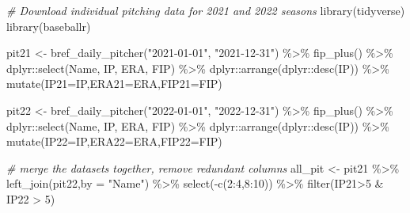 \documentclass[
  11pt,
]{book}
\newenvironment{Shaded}{\begin{snugshade}}{\end{snugshade}}
\newcommand{\AttributeTok}[1]{\textcolor[rgb]{0.77,0.63,0.00}{#1}}
\newcommand{\CommentTok}[1]{\textcolor[rgb]{0.56,0.35,0.01}{\textit{#1}}}
\newcommand{\DecValTok}[1]{\textcolor[rgb]{0.00,0.00,0.81}{#1}}
\newcommand{\FunctionTok}[1]{\textcolor[rgb]{0.00,0.00,0.00}{#1}}
\newcommand{\NormalTok}[1]{#1}
\newcommand{\OtherTok}[1]{\textcolor[rgb]{0.56,0.35,0.01}{#1}}
\newcommand{\SpecialCharTok}[1]{\textcolor[rgb]{0.00,0.00,0.00}{#1}}
\newcommand{\StringTok}[1]{\textcolor[rgb]{0.31,0.60,0.02}{#1}}
\theoremstyle{definition}
\theoremstyle{definition}
\theoremstyle{definition}
\theoremstyle{definition}
\theoremstyle{remark}
\begin{document}
\begin{Shaded}
\begin{Highlighting}[]
\CommentTok{\# Download individual pitching data for 2021 and 2022 seasons}
\FunctionTok{library}\NormalTok{(tidyverse)}
\FunctionTok{library}\NormalTok{(baseballr)}

\NormalTok{pit21 }\OtherTok{\textless{}{-}} \FunctionTok{bref\_daily\_pitcher}\NormalTok{(}\StringTok{"2021{-}01{-}01"}\NormalTok{, }\StringTok{"2021{-}12{-}31"}\NormalTok{) }\SpecialCharTok{\%\textgreater{}\%} 
  \FunctionTok{fip\_plus}\NormalTok{() }\SpecialCharTok{\%\textgreater{}\%} 
\NormalTok{  dplyr}\SpecialCharTok{::}\FunctionTok{select}\NormalTok{(Name, IP, ERA, FIP) }\SpecialCharTok{\%\textgreater{}\%}
\NormalTok{  dplyr}\SpecialCharTok{::}\FunctionTok{arrange}\NormalTok{(dplyr}\SpecialCharTok{::}\FunctionTok{desc}\NormalTok{(IP)) }\SpecialCharTok{\%\textgreater{}\%}
  \FunctionTok{mutate}\NormalTok{(}\AttributeTok{IP21=}\NormalTok{IP,}\AttributeTok{ERA21=}\NormalTok{ERA,}\AttributeTok{FIP21=}\NormalTok{FIP)}

\NormalTok{pit22 }\OtherTok{\textless{}{-}} \FunctionTok{bref\_daily\_pitcher}\NormalTok{(}\StringTok{"2022{-}01{-}01"}\NormalTok{, }\StringTok{"2022{-}12{-}31"}\NormalTok{) }\SpecialCharTok{\%\textgreater{}\%} 
  \FunctionTok{fip\_plus}\NormalTok{() }\SpecialCharTok{\%\textgreater{}\%} 
\NormalTok{  dplyr}\SpecialCharTok{::}\FunctionTok{select}\NormalTok{(Name, IP, ERA, FIP) }\SpecialCharTok{\%\textgreater{}\%}
\NormalTok{  dplyr}\SpecialCharTok{::}\FunctionTok{arrange}\NormalTok{(dplyr}\SpecialCharTok{::}\FunctionTok{desc}\NormalTok{(IP)) }\SpecialCharTok{\%\textgreater{}\%}
  \FunctionTok{mutate}\NormalTok{(}\AttributeTok{IP22=}\NormalTok{IP,}\AttributeTok{ERA22=}\NormalTok{ERA,}\AttributeTok{FIP22=}\NormalTok{FIP)}

\CommentTok{\# merge the datasets together, remove redundant columns}
\NormalTok{all\_pit }\OtherTok{\textless{}{-}}\NormalTok{ pit21 }\SpecialCharTok{\%\textgreater{}\%} 
  \FunctionTok{left\_join}\NormalTok{(pit22,}\AttributeTok{by =} \StringTok{"Name"}\NormalTok{) }\SpecialCharTok{\%\textgreater{}\%} 
  \FunctionTok{select}\NormalTok{(}\SpecialCharTok{{-}}\FunctionTok{c}\NormalTok{(}\DecValTok{2}\SpecialCharTok{:}\DecValTok{4}\NormalTok{,}\DecValTok{8}\SpecialCharTok{:}\DecValTok{10}\NormalTok{)) }\SpecialCharTok{\%\textgreater{}\%}
  \FunctionTok{filter}\NormalTok{(IP21}\SpecialCharTok{\textgreater{}}\DecValTok{5} \SpecialCharTok{\&}\NormalTok{ IP22 }\SpecialCharTok{\textgreater{}} \DecValTok{5}\NormalTok{)}
\end{Highlighting}
\end{Shaded}
\end{document}
